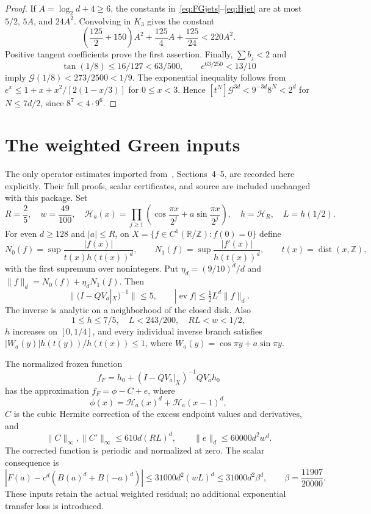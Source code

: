 \documentclass[11pt,a4paper]{article}
\theoremstyle{remark}\newtheorem*{ednote}{Editorial note (ProveIt, 2026-10-01)}
\newcommand{\ev}{\operatorname{ev}}\newcommand{\Z}{\mathbb Z}
\newcommand{\HH}{\mathcal H}\newcommand{\GG}{\mathcal G}
\begin{document}
\begin{proof}
If $A=\log_2d+4\ge6$, the constants in~\eqref{eq:FGjets}--\eqref{eq:Hjet} are at most $5/2$, $5A$, and $24A^2$. Convolving in $K_3$ gives the constant
\[
 \left(\frac{125}{2}+150\right)A^2+\frac{125}{4}A+\frac{125}{24}
 <220A^2.
\]
Positive tangent coefficients prove the first assertion. Finally, $\sum b_j<2$ and
\[
 \tan(1/8)\le16/127<63/500,\qquad e^{63/250}<13/10
\]
imply $\GG(1/8)<273/2500<1/9$. The exponential inequality follows from
$e^x\le1+x+x^2/[2(1-x/3)]$ for $0\le x<3$.
Hence $[t^N]\GG^{3d}<9^{-3d}8^N<2^d$ for $N\le7d/2$, since $8^7<4\cdot9^6$.
\end{proof}

\section{The weighted Green inputs}
The only operator estimates imported from~\cite{AllOrders}, Sections~4--5, are recorded here explicitly. Their full proofs, scalar certificates, and source are included unchanged with this package. Set
\[
 R=\frac25,\quad w=\frac{49}{100},\quad
 \HH_a(x)=\prod_{j\ge1}\left(\cos\frac{\pi x}{2^j}+a\sin\frac{\pi x}{2^j}\right),
 \quad h=\HH_R,\quad L=h(1/2).
\]
For even $d\ge128$ and $|a|\le R$, on
$X=\{f\in C^1(\mathbb R/\Z):f(0)=0\}$ define
\[
 N_0(f)=\sup\frac{|f(x)|}{t(x)h(t(x))^d},\qquad
 N_1(f)=\sup\frac{|f'(x)|}{h(t(x))^d},\qquad
 t(x)=\operatorname{dist}(x,\Z),
\]
with the first supremum over nonintegers. Put $\eta_d=(9/10)^d/d$ and
$\|f\|_d=N_0(f)+\eta_dN_1(f)$. Then
\begin{equation}\label{eq:green}
 \|(I-QV_a|_X)^{-1}\|\le5,\qquad
 |\ev f|\le\tfrac12L^d\|f\|_d.
\end{equation}
The inverse is analytic on a neighborhood of the closed disk. Also
\begin{equation}\label{eq:hfacts}
 1\le h\le7/5,\quad L<243/200,\quad RL<w<1/2,
\end{equation}
$h$ increases on $[0,1/4]$, and every individual inverse branch satisfies
$|W_a(y)|h(t(y))/h(t(x))\le1$, where $W_a(y)=\cos\pi y+a\sin\pi y$.

The normalized frozen function
\[
 f_F=h_0+(I-QV_a|_X)^{-1}QV_ah_0
\]
has the approximation $f_F=\phi-C+e$, where
\[
 \phi(x)=\HH_a(x)^d+\HH_a(x-1)^d,
\]
$C$ is the cubic Hermite correction of the excess endpoint values and derivatives, and
\begin{equation}\label{eq:repair}
 \|C\|_\infty,\|C'\|_\infty\le610d(RL)^d,
 \qquad \|e\|_d\le60000d^2w^d.
\end{equation}
The corrected function is periodic and normalized at zero. The scalar consequence is
\begin{equation}\label{eq:frozen}
 |F(a)-c^d(B(a)^d+B(-a)^d)|
 \le31000d^2(wL)^d\le31000d^2\beta^d,
 \qquad \beta=\frac{11907}{20000}.
\end{equation}
These inputs retain the actual weighted residual; no additional exponential transfer loss is introduced.
\end{document}
